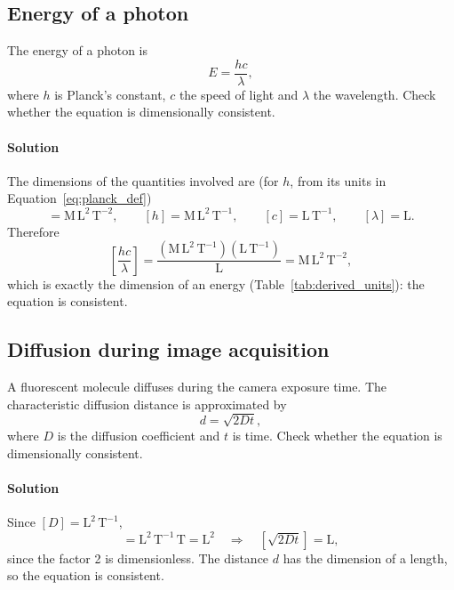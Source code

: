 \subsection{Energy of a photon}
\label{ex:photon_energy}

The energy of a photon is
\begin{equation*}
E = \frac{hc}{\lambda},
\end{equation*}
where $h$ is Planck's constant, $c$ the speed of light and $\lambda$ the wavelength. Check whether the equation is dimensionally consistent.

\paragraph{Solution} The dimensions of the quantities involved are (for $h$, from its units in Equation~\eqref{eq:planck_def})
\begin{equation*}
[E] = \text{M}\,\text{L}^2\,\text{T}^{-2}, \qquad [h] = \text{M}\,\text{L}^2\,\text{T}^{-1}, \qquad [c] = \text{L}\,\text{T}^{-1}, \qquad [\lambda] = \text{L}.
\end{equation*}
Therefore
\begin{equation*}
\left[\frac{hc}{\lambda}\right] = \frac{(\text{M}\,\text{L}^2\,\text{T}^{-1})(\text{L}\,\text{T}^{-1})}{\text{L}} = \text{M}\,\text{L}^2\,\text{T}^{-2},
\end{equation*}
which is exactly the dimension of an energy (Table~\ref{tab:derived_units}): the equation is consistent.

\subsection{Diffusion during image acquisition}
\label{ex:diffusion}

A fluorescent molecule diffuses during the camera exposure time. The characteristic diffusion distance is approximated by
\begin{equation*}
d = \sqrt{2Dt},
\end{equation*}
where $D$ is the diffusion coefficient and $t$ is time. Check whether the equation is dimensionally consistent.

\paragraph{Solution} Since $[D] = \text{L}^2\,\text{T}^{-1}$,
\begin{equation*}
[Dt] = \text{L}^2\,\text{T}^{-1}\,\text{T} = \text{L}^2 \quad \Longrightarrow \quad [\sqrt{2Dt}] = \text{L},
\end{equation*}
since the factor 2 is dimensionless. The distance $d$ has the dimension of a length, so the equation is consistent.

